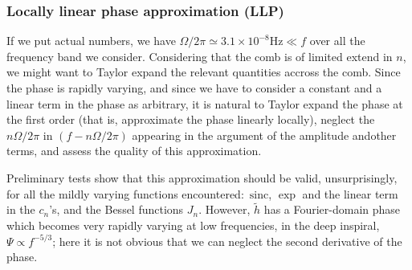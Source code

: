 \documentclass[aps,showpacs,twocolumn,prd,superscriptaddress,nofootinbib]{revtex4}
\newcommand{\sinc}{\,\mathrm{sinc}}
\begin{document}

\subsubsection*{Locally linear phase approximation (LLP)}

If we put actual numbers, we have $\Omega/2\pi \simeq 3.1\times10^{-8}\mathrm{Hz} \ll f$ over all the frequency band we consider. Considering that the comb is of limited extend in $n$, we might want to Taylor expand the relevant quantities accross the comb. Since the phase is rapidly varying, and since we have to consider a constant and a linear term in the phase as arbitrary, it is natural to Taylor expand the phase at the first order (that is, approximate the phase linearly locally), neglect the $n\Omega/2\pi$ in $(f-n\Omega/2\pi)$ appearing in the argument of the amplitude andother terms, and assess the quality of this approximation.

Preliminary tests show that this approximation should be valid, unsurprisingly, for all the mildly varying functions encountered: $\sinc$, $\exp$ and the linear term in the $c_{n}$'s, and the Bessel functions $J_{n}$. However, $\tilde{h}$ has a Fourier-domain phase which becomes very rapidly varying at low frequencies, in the deep inspiral, $\Psi\propto f^{-5/3}$; here it is not obvious that we can neglect the second derivative of the phase.
\end{document}
